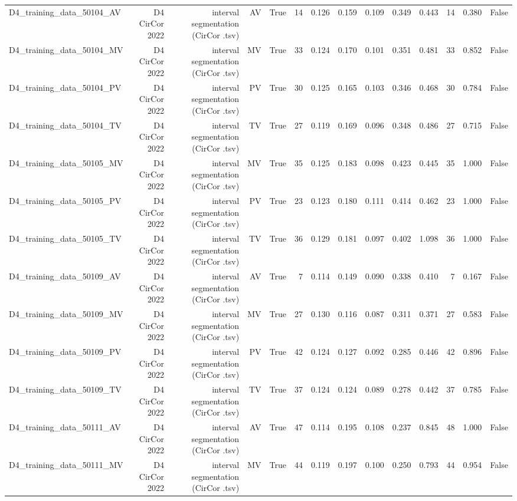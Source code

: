 \begin{table}[htbp]
\begin{tabular}{lrrrrrrrrrrrrr}
    D4\_training\_data\_50104\_AV & D4 CirCor 2022 & interval segmentation (CirCor .tsv) & AV & True & 14 & 0.126 & 0.159 & 0.109 & 0.349 & 0.443 & 14 & 0.380 & False \\
    D4\_training\_data\_50104\_MV & D4 CirCor 2022 & interval segmentation (CirCor .tsv) & MV & True & 33 & 0.124 & 0.170 & 0.101 & 0.351 & 0.481 & 33 & 0.852 & False \\
    D4\_training\_data\_50104\_PV & D4 CirCor 2022 & interval segmentation (CirCor .tsv) & PV & True & 30 & 0.125 & 0.165 & 0.103 & 0.346 & 0.468 & 30 & 0.784 & False \\
    D4\_training\_data\_50104\_TV & D4 CirCor 2022 & interval segmentation (CirCor .tsv) & TV & True & 27 & 0.119 & 0.169 & 0.096 & 0.348 & 0.486 & 27 & 0.715 & False \\
    D4\_training\_data\_50105\_MV & D4 CirCor 2022 & interval segmentation (CirCor .tsv) & MV & True & 35 & 0.125 & 0.183 & 0.098 & 0.423 & 0.445 & 35 & 1.000 & False \\
    D4\_training\_data\_50105\_PV & D4 CirCor 2022 & interval segmentation (CirCor .tsv) & PV & True & 23 & 0.123 & 0.180 & 0.111 & 0.414 & 0.462 & 23 & 1.000 & False \\
    D4\_training\_data\_50105\_TV & D4 CirCor 2022 & interval segmentation (CirCor .tsv) & TV & True & 36 & 0.129 & 0.181 & 0.097 & 0.402 & 1.098 & 36 & 1.000 & False \\
    D4\_training\_data\_50109\_AV & D4 CirCor 2022 & interval segmentation (CirCor .tsv) & AV & True & 7 & 0.114 & 0.149 & 0.090 & 0.338 & 0.410 & 7 & 0.167 & False \\
    D4\_training\_data\_50109\_MV & D4 CirCor 2022 & interval segmentation (CirCor .tsv) & MV & True & 27 & 0.130 & 0.116 & 0.087 & 0.311 & 0.371 & 27 & 0.583 & False \\
    D4\_training\_data\_50109\_PV & D4 CirCor 2022 & interval segmentation (CirCor .tsv) & PV & True & 42 & 0.124 & 0.127 & 0.092 & 0.285 & 0.446 & 42 & 0.896 & False \\
    D4\_training\_data\_50109\_TV & D4 CirCor 2022 & interval segmentation (CirCor .tsv) & TV & True & 37 & 0.124 & 0.124 & 0.089 & 0.278 & 0.442 & 37 & 0.785 & False \\
    D4\_training\_data\_50111\_AV & D4 CirCor 2022 & interval segmentation (CirCor .tsv) & AV & True & 47 & 0.114 & 0.195 & 0.108 & 0.237 & 0.845 & 48 & 1.000 & False \\
    D4\_training\_data\_50111\_MV & D4 CirCor 2022 & interval segmentation (CirCor .tsv) & MV & True & 44 & 0.119 & 0.197 & 0.100 & 0.250 & 0.793 & 44 & 0.954 & False \\

\end{tabular}
\end{table}
